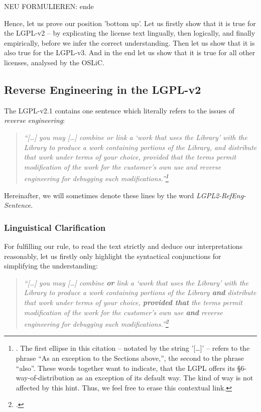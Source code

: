 NEU FORMULIEREN: ende

Hence, let us prove our position 'bottom up'. Let us firstly show that it is
true for the LGPL-v2 -- by explicating the license text lingually, then
logically, and finally empirically, before we infer the correct understanding.
Then let us show that it is also true for the LGPL-v3. And in the end let us
show that it is true for all other licenses, analysed by the OSLiC.

\subsection{Reverse Engineering in the LGPL-v2}
The LGPL-v2.1 contains one sentence which literally refers to the issues of
\emph{reverse engineering}:

\begin{quote}\noindent\emph{\enquote{[\ldots] you may [\ldots] combine or link a
\enquote{work that uses the Library} with the Library to produce a work
containing portions of the Library, and distribute that work under terms of your
choice, provided that the terms permit modification of the work for the
customer's own use and \emph{reverse engineering} for debugging such
modifications.}\footnote{\cite[cf.][\nopage wp. §6. ]{Lgpl21OsiLicense1999a}.
The first ellipse in this citation -- notated by the string '[\ldots]' -- refers
to the phrase \enquote{As an exception to the Sections above,}, the second to
the phrase \enquote{also}. These words together want to indicate, that the LGPL
offers its §6-way-of-distribution as an exception of its default way. The kind
of way is not affected by this hint. Thus, we feel free to erase this contextual
link.}}\end{quote}

Hereinafter, we will sometimes denote these lines by
the word \emph{LGPL2-RefEng-Sentence}.

\subsubsection{Linguistical Clarification}

For fulfilling our rule, to read the text strictly and deduce our
interpretations reasonably, let us firstly only highlight the syntactical
conjunctions for simplifying the understanding:

\begin{quote}\noindent\emph{\enquote{[\ldots] you may [\ldots] combine
\textbf{or} link a \enquote{work that uses the Library} with the Library to
produce a work containing portions of the Library \textbf{and} distribute that
work under terms of your choice, \textbf{provided that} the terms permit
modification of the work for the customer's own use \textbf{and} \emph{reverse
engineering} for debugging such modifications.}\footnote{\cite[cf.][\nopage wp.
emphasis KR.]{Lgpl21OsiLicense1999a}.}}
\end{quote}

